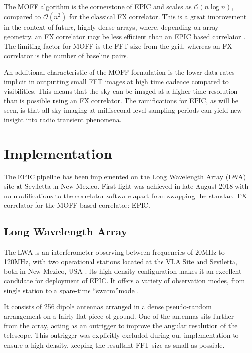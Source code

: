 \documentclass[bibliography=totocnumbered, twocolumn]{article}
\begin{document}
The MOFF algorithm is the cornerstone of EPIC and scales as
$\mathcal{O}(n\log{n})$, compared to $\mathcal{O}(n^2)$ for the
classical FX correlator. This is a great improvement in the
context of future, highly dense arrays, where, depending on
array geometry, an FX correlator may be less efficient than
an EPIC based correlator \citep{thyagarajan_generic_2017}.
The limiting factor for MOFF is the FFT size from the grid,
whereas an FX correlator is the number of baseline pairs.

An additional characteristic of the MOFF formulation is the
lower data rates implicit in outputting small FFT images at
high time cadence compared to visibilities. This means that
the sky can be imaged at a higher time resolution than is
possible using an FX correlator. The ramifications for EPIC,
as will be seen, is that all-sky imaging at millisecond-level
sampling periods can yield new insight into radio transient
phenomena.

\section{Implementation} \label{sec:implementation}

The EPIC pipeline has been implemented on the Long Wavelength Array (LWA)
site at Seviletta in New Mexico. First light was achieved in late
August 2018 with no modifications to the correlator software apart
from swapping the standard FX correlator for the MOFF based correlator: EPIC.


\subsection{Long Wavelength Array}

The LWA is an interferometer observing
between frequencies of 20MHz to 120MHz, with two operational stations
located at the VLA Site and Seviletta, both in New Mexico, USA \citep{henning_first_2010}\citep{taylor_first_2012}. Its
high density configuration makes it an excellent candidate for
deployment of EPIC. It offers a variety of observation modes, from
single station to a spare-time ``swarm''mode \citep{dowell_swarm_2018}.

It consists of 256 dipole antennas arranged in a dense pseudo-random
arrangement on a fairly flat piece of ground. One of the antennas
sits further from the array, acting as an outrigger to improve the
angular resolution of the telescope. This outrigger was explicitly
excluded during our implementation to ensure a high density, keeping
the resultant FFT size as small as possible.
\end{document}
